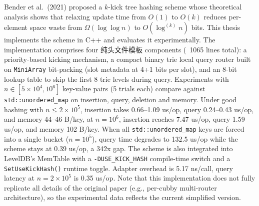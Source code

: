 \documentclass[
    type = bachelor,
    fontset = win,
    decl-page = true,
  ]{njuthesis}
\begin{document}
\maketitle
\raggedbottom

\begin{abstract}
Bender等人在2021年提出了一种名为$k$-kick树的哈希方案\cite{1}，
其理论分析表明，若将哈希表的更新时间从$O(1)$放宽至$O(k)$，
可将每键空间浪费从$\Omega(\log\log n)$压缩至$O(\log^{(k)} n)$比特。
本文依据此方案做了工程实现和实验验证。
实现方面，以C++构建了一个分层的弹性哈希存储结构，约1065行纯头文件模板代码。
包含基于优先级的踢出机制、用\texttt{MiniArray}位压缩数组实现的紧凑二叉字典树路由、
以及一个8-bit Lookup Table用于跳过字典树前8层加速查询。
槽元数据和空闲槽位图分别压至每槽4比特和1比特。
实验方面，在良好哈希条件下取$n\in[5\times10^4,10^6]$五个规模，
以\texttt{std::unordered\_map}为对照，每组5次独立试验，测量插入、查询、删除和内存。
$n\leq 2\times10^5$时，插入约0.66--1.09 us/op，查询约0.24--0.43 us/op，内存约44--46 B/key；
$n=10^6$时因合并摊还，插入升至约7.47 us/op，查询约1.59 us/op，内存约102 B/key。
高碰撞条件下，\texttt{std::unordered\_map}所有键被打入同一桶，$n=10^5$时查询退化至132.5 us/op，
而本方案保持在0.39 us/op，差距约342倍。
此外，将方案以适配器方式接入LevelDB 内存表层，提供CMake编译开关和运行时开关。
适配层单次Hash转换约5.17 ns，$n=2\times10^5$时查询约0.35 us/op。
需要说明的是，本实现未完整复刻论文中的per-cubby多路由器架构等细节，实验数据反映的是当前简化版本的表现。
\end{abstract}

\begin{abstract*}
Bender et al.\ (2021) proposed a $k$-kick tree hashing scheme \cite{1}
whose theoretical analysis shows that relaxing update time from $O(1)$ to $O(k)$
reduces per-element space waste from $\Omega(\log\log n)$ to $O(\log^{(k)} n)$ bits.
This thesis implements the scheme in C++ and evaluates it experimentally.
The implementation comprises four 纯头文件模板 components (~1065 lines total):
a priority-based kicking mechanism, a compact binary trie local query router
built on \texttt{MiniArray} bit-packing (slot metadata at 4+1 bits per slot),
and an 8-bit lookup table to skip the first 8 trie levels during query.
Experiments with $n\in[5\times10^4,10^6]$ key-value pairs (5 trials each)
compare against \texttt{std::unordered\_map} on insertion, query, deletion and memory.
Under good hashing with $n\leq 2\times10^5$, insertion takes 0.66--1.09 us/op,
query 0.24--0.43 us/op, and memory 44--46 B/key, at $n=10^6$, insertion reaches
7.47 us/op, query 1.59 us/op, and memory 102 B/key.
When all \texttt{std::unordered\_map} keys are forced into a single bucket ($n=10^5$),
query time degrades to 132.5 us/op while the scheme stays at 0.39 us/op, a 342x gap.
The scheme is also integrated into LevelDB's MemTable with a \texttt{-DUSE\_KICK\_HASH}
compile-time switch and a \texttt{SetUseKickHash()} runtime toggle. Adapter overhead
is 5.17 ns/call, query latency at $n=2\times10^5$ is 0.35 us/op.
Note that this implementation does not fully replicate all details of the original paper
(e.g., per-cubby multi-router architecture), so the experimental data
reflects the current simplified version.
\end{abstract*}
\end{document}
